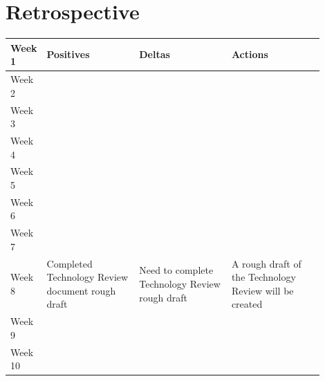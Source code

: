 \documentclass[onecolumn, draftclsnofoot,10pt, compsoc]{IEEEtran}
\begin{document}
\section{Retrospective}
\begin{center}
	\begin{tabular}{| l | p{0.3\linewidth} | p{0.3\linewidth} | p{0.3\linewidth} |}
		\hline
		Week 1 & Positives & Deltas & Actions \\ \hline
		Week 2 & & & \\ \hline				%
		Week 3 & & & \\ \hline
		Week 4 & & & \\ \hline
		Week 5 & & & \\ \hline
		Week 6 & & & \\ \hline
		Week 7 & & & \\ \hline
		Week 8 & Completed Technology Review document rough draft & Need to complete Technology Review rough draft & A rough draft of the Technology Review will be created \\ \hline
		Week 9 & & & \\ \hline
		Week 10 & & & \\ \hline




	\end{tabular}
\end{center}
\end{document}
